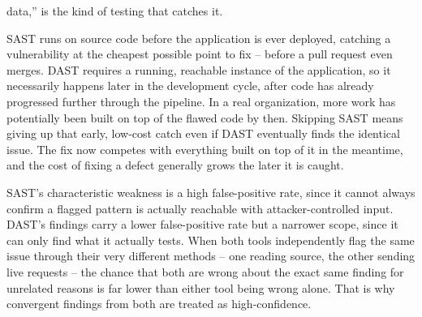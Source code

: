 \begin{answerkey}
data,'' is the kind of testing that catches it.
\item SAST runs on source code before the application is ever deployed, catching a vulnerability at
the cheapest possible point to fix -- before a pull request even merges. DAST requires a running,
reachable instance of the application, so it necessarily happens later in the development cycle,
after code has already progressed further through the pipeline. In a real organization, more work
has potentially been built on top of the flawed code by then. Skipping SAST means giving up that
early, low-cost catch even if DAST eventually finds the identical issue. The fix now
competes with everything built on top of it in the meantime, and the cost of fixing a defect
generally grows the later it is caught.
\item SAST's characteristic weakness is a high false-positive rate, since it cannot always confirm
a flagged pattern is actually reachable with attacker-controlled input. DAST's findings carry a
lower false-positive rate but a narrower scope, since it can only find what it actually tests.
When both tools independently flag the same issue through their very different methods -- one
reading source, the other sending live requests -- the chance that both are wrong about the exact
same finding for unrelated reasons is far lower than either tool being wrong alone. That is why
convergent findings from both are treated as high-confidence.
\end{answerkey}
